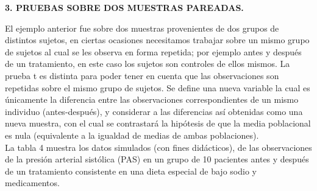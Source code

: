 \documentclass[12pt,letterpaper]{article}\usepackage[]{graphicx}\usepackage[]{color}
\begin{document}
\begin{center}
\textbf{3. PRUEBAS SOBRE DOS MUESTRAS PAREADAS.}
\end{center}

El ejemplo anterior fue sobre dos muestras provenientes de dos grupos de distintos sujetos, en ciertas ocasiones necesitamos trabajar sobre un mismo grupo de sujetos al cual se les observa en forma repetida; por ejemplo antes y despu\'es de un tratamiento, en este caso los sujetos son controles de ellos mismos. La prueba t es distinta para poder tener en cuenta que las observaciones son repetidas sobre el mismo grupo de sujetos. Se define una nueva variable la cual es \'unicamente la diferencia entre las observaciones correspondientes de un mismo individuo (antes-despu\'es), y considerar a las diferencias as\'i obtenidas como una nueva muestra, con el cual se contrastar\'a la hip\'otesis de que la media poblacional es nula (equivalente a la igualdad de medias de ambas poblaciones).\\

La tabla 4 muestra los datos simulados (con fines did\'acticos), de las observaciones de la presi\'on arterial sist\'olica (PAS) en un grupo de 10 pacientes antes y despu\'es de un tratamiento consistente en una dieta especial de bajo sodio y medicamentos.\\
\end{document}
